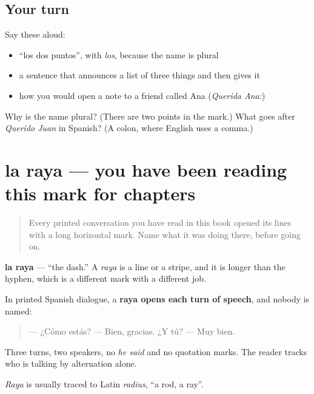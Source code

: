 \subsection*{Your turn}
Say these aloud:

\begin{itemize}
\raggedright
  \item \textquotedblleft{}los dos puntos\textquotedblright{}, with \emph{los}, because the name is plural
  \item a sentence that announces a list of three things and then gives it
  \item how you would open a note to a friend called Ana (\emph{Querida Ana:})
\end{itemize}

\begin{tcolorbox}[breakable,colback=teal!4,colframe=teal!35!black,title={Before you move on}]
Why is the name plural? (There are two points in the mark.) What goes after \emph{Querido Juan} in Spanish? (A colon, where English uses a comma.)
\end{tcolorbox}
\section[la raya]{la raya — you have been reading this mark for chapters}

\label{lesson:ES-C424-raya}



\begin{quote}
Every printed conversation you have read in this book opened its lines with a long horizontal mark. Name what it was doing there, before going on.
\end{quote}

\begin{cousinweb}
\textbf{la raya} — \textquotedblleft{}the dash.\textquotedblright{} A \emph{raya} is a line or a stripe, and it is longer than the hyphen, which is a different mark with a different job.

In printed Spanish dialogue, a \textbf{raya opens each turn of speech}, and nobody is named:

\begin{quote}
— ¿Cómo estás? — Bien, gracias. ¿Y tú? — Muy bien.
\end{quote}

Three turns, two speakers, no \emph{he said} and no quotation marks. The reader tracks who is talking by alternation alone.

\emph{Raya} is usually traced to Latin \emph{radius}, \textquotedblleft{}a rod, a ray\textquotedblright{}.
\end{cousinweb}

